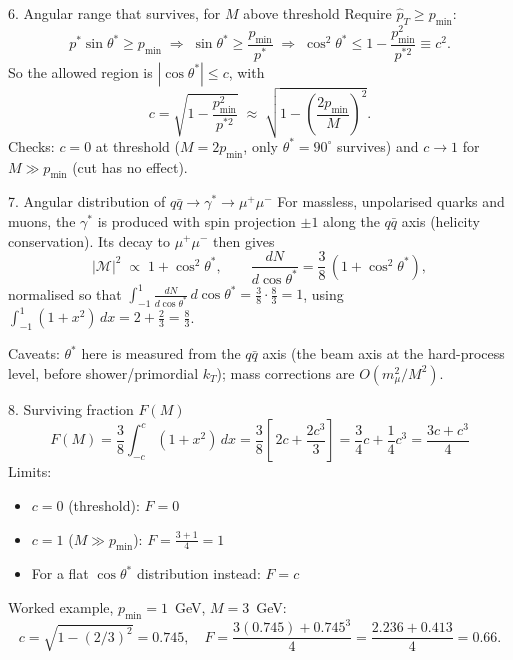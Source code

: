 \documentclass[aspectratio=169]{beamer}
\begin{document}
\begin{frame}{6. Angular range that survives, for $M$ above threshold}
  Require $\hat p_T \ge p_{\min}$:
  \[
    p^*\sin\theta^* \ge p_{\min}
    \;\Rightarrow\;
    \sin\theta^* \ge \frac{p_{\min}}{p^*}
    \;\Rightarrow\;
    \cos^2\theta^* \le 1 - \frac{p_{\min}^2}{p^{*2}} \equiv c^2 .
  \]
  So the allowed region is $|\cos\theta^*| \le c$, with
  \[
    c = \sqrt{1 - \frac{p_{\min}^2}{p^{*2}}}
      \;\approx\; \sqrt{1 - \left(\frac{2p_{\min}}{M}\right)^{2}} .
  \]
  Checks: $c=0$ at threshold ($M=2p_{\min}$, only $\theta^*=90^\circ$ survives) and
  $c \to 1$ for $M \gg p_{\min}$ (cut has no effect).
\end{frame}

\begin{frame}{7. Angular distribution of $q\bar q\to\gamma^*\to\mu^+\mu^-$}
  For massless, unpolarised quarks and muons, the $\gamma^*$ is produced with spin projection
  $\pm1$ along the $q\bar q$ axis (helicity conservation). Its decay to $\mu^+\mu^-$ then gives
  \[
    |\mathcal M|^2 \;\propto\; 1 + \cos^2\theta^* ,
    \qquad
    \frac{dN}{d\cos\theta^*} = \frac{3}{8}\,(1+\cos^2\theta^*) ,
  \]
  normalised so that $\int_{-1}^{1}\frac{dN}{d\cos\theta^*}\,d\cos\theta^* = \frac38\cdot\frac83 = 1$,
  using $\int_{-1}^{1}(1+x^2)\,dx = 2 + \tfrac23 = \tfrac83$.

  \medskip
  Caveats: $\theta^*$ here is measured from the $q\bar q$ axis (the beam axis at the hard-process
  level, before shower/primordial $k_T$); mass corrections are $O(m_\mu^2/M^2)$.
\end{frame}

\begin{frame}{8. Surviving fraction $F(M)$}
  \[
    F(M) = \frac{3}{8}\int_{-c}^{c}(1+x^2)\,dx
         = \frac{3}{8}\left[\,2c + \frac{2c^3}{3}\right]
         = \frac{3}{4}c + \frac{1}{4}c^3
         = \boxed{\frac{3c + c^3}{4}}
  \]
  Limits:
  \begin{itemize}
    \item $c=0$ (threshold): $F=0$
    \item $c=1$ ($M\gg p_{\min}$): $F = \frac{3+1}{4} = 1$
    \item For a flat $\cos\theta^*$ distribution instead: $F = c$
  \end{itemize}
  Worked example, $p_{\min}=1$~GeV, $M=3$~GeV:
  \[
    c = \sqrt{1-(2/3)^2} = 0.745,\quad
    F = \frac{3(0.745) + 0.745^3}{4} = \frac{2.236+0.413}{4} = 0.66 .
  \]
\end{frame}
\end{document}
